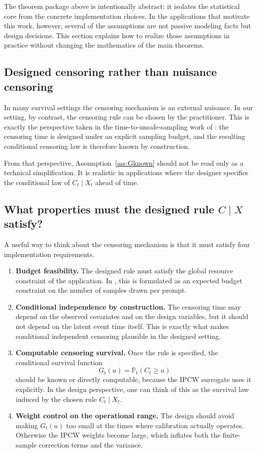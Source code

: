 \documentclass[11pt]{article}
\newcommand{\Prob}{\mathbb{P}}
\newcommand{\1}{\mathbf{1}}
\begin{document}
The theorem package above is intentionally abstract: it isolates the statistical core from the concrete implementation choices. In the applications that motivate this work, however, several of the assumptions are not passive modeling facts but design decisions. This section explains how to realize those assumptions in practice without changing the mathematics of the main theorems.

\subsection{Designed censoring rather than nuisance censoring}

In many survival settings the censoring mechanism is an external nuisance. In our setting, by contrast, the censoring rule can be chosen by the practitioner. This is exactly the perspective taken in the time-to-unsafe-sampling work of \citet{Davidov2025}: the censoring time is designed under an explicit sampling budget, and the resulting conditional censoring law is therefore known by construction.

From that perspective, Assumption~\ref{ass:Gknown} should not be read only as a technical simplification. It is realistic in applications where the designer specifies the conditional law of $C_t\mid X_t$ ahead of time.

\subsection{What properties must the designed rule $C\mid X$ satisfy?}

A useful way to think about the censoring mechanism is that it must satisfy four implementation requirements.
\begin{enumerate}[leftmargin=*,itemsep=2pt]
  \item \textbf{Budget feasibility.} The designed rule must satisfy the global resource constraint of the application. In \citet{Davidov2025}, this is formulated as an expected budget constraint on the number of samples drawn per prompt.
  \item \textbf{Conditional independence by construction.} The censoring time may depend on the observed covariates and on the design variables, but it should not depend on the latent event time itself. This is exactly what makes conditional independent censoring plausible in the designed setting.
  \item \textbf{Computable censoring survival.} Once the rule is specified, the conditional survival function
  \[
  G_t(u)=\Prob_t(C_t\ge u)
  \]
  should be known or directly computable, because the IPCW surrogate uses it explicitly. In the design perspective, one can think of this as the survival law induced by the chosen rule \(C_t\mid X_t\).
  \item \textbf{Weight control on the operational range.} The design should avoid making \(G_t(u)\) too small at the times where calibration actually operates. Otherwise the IPCW weights become large, which inflates both the finite-sample correction terms and the variance.
\end{enumerate}
\end{document}
